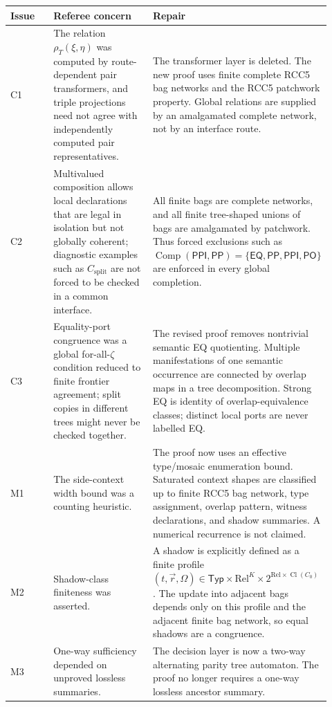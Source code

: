 \documentclass[11pt]{article}
\newcommand{\EQ}{\mathsf{EQ}}
\newcommand{\PP}{\mathsf{PP}}
\newcommand{\PPI}{\mathsf{PPI}}
\newcommand{\PO}{\mathsf{PO}}
\newcommand{\Comp}{\operatorname{Comp}}
\newcommand{\Cl}{\operatorname{Cl}}
\begin{document}
\begin{longtable}{p{0.16\linewidth}p{0.38\linewidth}p{0.38\linewidth}}
\toprule
Issue & Referee concern & Repair\\
\midrule
C1 & The relation $\rho_T(\xi,\eta)$ was computed by route-dependent pair transformers,
and triple projections need not agree with independently computed pair representatives. &
The transformer layer is deleted.  The new proof uses finite complete RCC5 bag networks
and the RCC5 patchwork property.  Global relations are supplied by an amalgamated
complete network, not by an interface route.\\
\addlinespace
C2 & Multivalued composition allows local declarations that are legal in isolation but
not globally coherent; diagnostic examples such as $C_{\mathrm{split}}$ are not forced to
be checked in a common interface. &
All finite bags are complete networks, and all finite tree-shaped unions of bags are
amalgamated by patchwork.  Thus forced exclusions such as
$\Comp(\PPI,\PP)=\{\EQ,\PP,\PPI,\PO\}$ are enforced in every global completion.\\
\addlinespace
C3 & Equality-port congruence was a global for-all-$\zeta$ condition reduced to finite
frontier agreement; split copies in different trees might never be checked together. &
The revised proof removes nontrivial semantic EQ quotienting.  Multiple manifestations of
one semantic occurrence are connected by overlap maps in a tree decomposition.  Strong
EQ is identity of overlap-equivalence classes; distinct local ports are never labelled
EQ.\\
\addlinespace
M1 & The side-context width bound was a counting heuristic. &
The proof now uses an effective type/mosaic enumeration bound.  Saturated context shapes
are classified up to finite RCC5 bag network, type assignment, overlap pattern, witness
declarations, and shadow summaries.  A numerical recurrence is not claimed.\\
\addlinespace
M2 & Shadow-class finiteness was asserted. &
A shadow is explicitly defined as a finite profile
$(t,\vec r,\Omega)\in\mathsf{Typ}\times\mathrm{Rel}^K\times
2^{\mathrm{Rel}\times\Cl(C_0)}$.  The update into adjacent bags depends only on this
profile and the adjacent finite bag network, so equal shadows are a congruence.\\
\addlinespace
M3 & One-way sufficiency depended on unproved lossless summaries. &
The decision layer is now a two-way alternating parity tree automaton.  The proof no
longer requires a one-way lossless ancestor summary.\\

\end{longtable}
\end{document}
